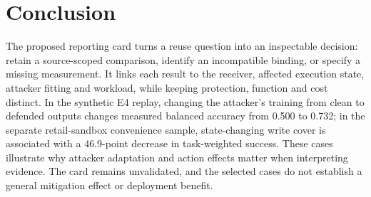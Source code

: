 \section{Conclusion}\label{sec:conclusion}
The proposed reporting card turns a reuse question into an inspectable decision: retain a source-scoped comparison, identify an incompatible binding, or specify a missing measurement. It links each result to the receiver, affected execution state, attacker fitting and workload, while keeping protection, function and cost distinct. In the synthetic E4 replay, changing the attacker's training from clean to defended outputs changes measured balanced accuracy from 0.500 to 0.732; in the separate retail-sandbox convenience sample, state-changing write cover is associated with a 46.9-point decrease in task-weighted success. These cases illustrate why attacker adaptation and action effects matter when interpreting evidence. The card remains unvalidated, and the selected cases do not establish a general mitigation effect or deployment benefit.

